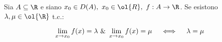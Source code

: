\documentclass[../analisi.tex]{subfiles}
\begin{document}

\begin{defn}
Sia $\acr$ e siano $x_0 \in D(A),\ x_0 \in \ol{R},\ f: A \to \R$.
Se esistono $ \lambda, \mu \in \ol{\R}$ t.c.:


\begin{equation}
	\lim \limits_{x \to x_0} f(x) = \lambda\ \&\ \lim \limits_{x \to x_0} f(x) = \mu \quad 
	\iff \quad \lambda = \mu
\end{equation}
\end{defn}

\begin{dimo}

\end{dimo}
\end{document}
